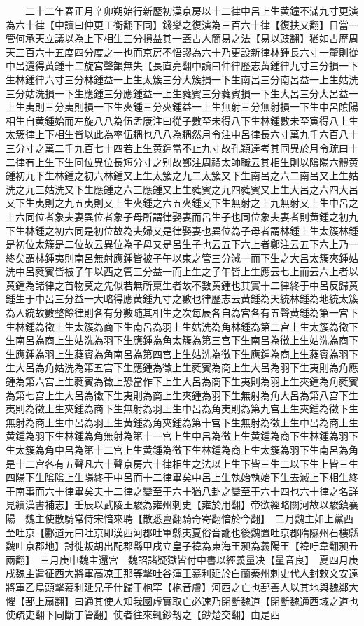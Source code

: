 　　二十二年春正月辛卯朔始行新歷初漢京房以十二律中呂上生黄鐘不滿九寸更演為六十律【中讀曰仲更工衡翻下同】錢樂之復演為三百六十律【復扶又翻】日當一管何承天立議以為上下相生三分損益其一蓋古人簡易之法【易以豉翻】猶如古歷周天三百六十五度四分度之一也而京房不悟謬為六十乃更設新律林鍾長六寸一釐則從中呂還得黄鍾十二旋宫聲韻無失【長直亮翻中讀曰仲律歷志黄鍾律九寸三分損一下生林鍾律六寸三分林鍾益一上生太簇三分大簇損一下生南呂三分南呂益一上生姑洗三分姑洗損一下生應鍾三分應鍾益一上生蕤賓三分蕤賓損一下生大呂三分大呂益一上生夷則三分夷則損一下生夾鍾三分夾鍾益一上生無射三分無射損一下生中呂隂陽相生自黄鍾始而左旋八八為伍孟康注曰從子數至未得八下生林鍾數未至寅得八上生太簇律上下相生皆以此為率伍耦也八八為耦然月令注中呂律長六寸萬九千六百八十三分寸之萬二千九百七十四若上生黄鍾當不止九寸故孔穎達考其同異於月令疏曰十二律有上生下生冋位異位長短分寸之别故鄭注周禮太師職云其相生則以隂陽六體黄鍾初九下生林鍾之初六林鍾又上生太簇之九二太簇又下生南呂之六二南呂又上生姑洗之九三姑洗又下生應鍾之六三應鍾又上生蕤賓之九四蕤賓又上生大呂之六四大呂又下生夷則之九五夷則又上生夾鍾之六五夾鍾又下生無射之上九無射又上生中呂之上六同位者象夫妻異位者象子母所謂律娶妻而呂生子也同位象夫妻者則黄鍾之初九下生林鍾之初六同是初位故為夫婦又是律娶妻也異位為子母者謂林鍾上生太簇林鍾是初位太簇是二位故云異位為子母又是呂生子也云五下六上者鄭注云五下六上乃一終矣謂林鍾夷則南呂無射應鍾皆被子午以東之管三分減一而下生之大呂太簇夾鍾姑洗中呂蕤賓皆被子午以西之管三分益一而上生之子午皆上生應云七上而云六上者以黄鍾為諸律之首物莫之先似若無所稟生者故不數黄鍾也其實十二律終于中呂反歸黄鍾生于中呂三分益一大略得應黄鍾九寸之數也律歷志云黄鍾為天統林鍾為地統太簇為人統故數整餘律則各有分數随其相生之次每辰各自為宫各有五聲黄鍾為第一宫下生林鍾為徵上生太簇為商下生南呂為羽上生姑洗為角林鍾為第二宫上生太簇為徵下生南呂為商上生姑洗為羽下生應鍾為角太簇為第三宫下生南呂為徵上生姑洗為商下生應鍾為羽上生蕤賓為角南呂為第四宫上生姑洗為徵下生應鍾為商上生蕤賓為羽下生大呂為角姑洗為第五宫下生應鍾為徵上生蕤賓為商上生大呂為羽下生夷則為角應鍾為第六宫上生蕤賓為徵上恐當作下上生大呂為商下生夷則為羽上生夾鍾為角蕤賓為第七宫上生大呂為徵下生夷則為商上生夾鍾為羽下生無射為角大呂為第八宫下生夷則為徵上生夾鍾為商下生無射為羽上生中呂為角夷則為第九宫上生夾鍾為徵下生無射為商上生中呂為羽上生黄鍾為角夾鍾為第十宫下生無射為徵上生中呂為商上生黄鍾為羽下生林鍾為角無射為第十一宫上生中呂為徵上生黄鍾為商下生林鍾為羽下生太簇為角中呂為第十二宫上生黄鍾為徵下生林鍾為商上生太簇為羽下生南呂為角是十二宫各有五聲凡六十聲京房六十律相生之法以上生下皆三生二以下生上皆三生四陽下生隂隂上生陽終于中呂而十二律畢矣中呂上生執始執始下生去滅上下相生終于南事而六十律畢矣夫十二律之變至于六十猶八卦之變至于六十四也六十律之名詳見續漢書補志】壬辰以武陵王駿為雍州刺史【雍於用翻】帝欲經略關河故以駿鎮襄陽　魏主使散騎常侍宋愔來聘【散悉亶翻騎奇寄翻愔於今翻】　二月魏主如上黨西至吐京【酈道元曰吐京即漢西河郡吐軍縣夷夏俗音訛也後魏置吐京郡隋隰州石樓縣魏吐京郡地】討徙叛胡出配郡縣甲戌立皇子褘為東海王昶為義陽王【褘吁韋翻昶丑兩翻】　三月庚申魏主還宫　魏詔諸疑獄皆付中書以經義量决【量音良】　夏四月庚戌魏主遣征西大將軍高凉王那等擊吐谷渾王慕利延於白蘭秦州刺史代人封敕文安遠將軍乙烏頭擊慕利延兄子什歸于枹罕【枹音膚】河西之亡也鄯善人以其地與魏鄰大懼【鄯上扇翻】曰通其使人知我國虛實取亡必速乃閉斷魏道【閉斷魏通西域之道也使疏吏翻下同斷丁管翻】使者往來輒鈔刼之【鈔楚交翻】由是西